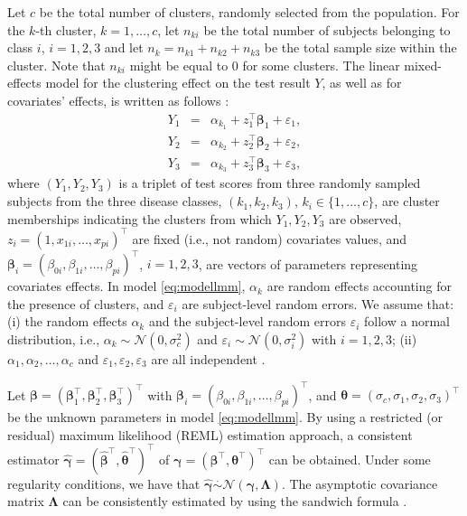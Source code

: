 Let $c$ be the total number of clusters, randomly selected from the population. For the $k$-th cluster, $k=1, \ldots, c$, let $n_{ki}$ be the total number of subjects belonging to class $i$, $i = 1,2,3$ and let $n_k = n_{k1} + n_{k2} + n_{k3}$ be the total sample size within the cluster. Note that $n_{ki}$ might be equal to 0 for some clusters. The linear {mixed-effects} model for the clustering effect on the test result $Y$, as well as for covariates' effects, is written as follows \citep{xiong2018estimating, khanh2022}: 
\begin{eqnarray}
    Y_{1} &=& \alpha_{k_1} + z_1^\top \boldsymbol{\beta}_1 + \varepsilon_{1}, \nonumber \\
    Y_{2} &=& \alpha_{k_2} + z_2^\top  \boldsymbol{\beta}_2 + \varepsilon_{2}, \label{eq:modellmm} \\
    Y_{3} &=& \alpha_{k_3} + z_3^\top \boldsymbol{\beta}_3 + \varepsilon_{3}, \nonumber
\end{eqnarray}
where $(Y_1, Y_2, Y_3)$ is a triplet of test scores from three randomly sampled subjects from the three disease classes, $(k_1, k_2, k_3)$, $k_i \in \{1, \ldots, c\}$, are cluster memberships indicating the clusters from which $Y_1, Y_2, Y_3$ are observed, $z_i = (1, x_{1i}, \ldots, x_{pi})^\top$ are fixed (i.e., not random) covariates values, and $\boldsymbol{\beta}_i = (\beta_{0i}, \beta_{1i}, \ldots, \beta_{pi})^\top$, $i=1,2,3$, are vectors of parameters representing covariates effects. In model \eqref{eq:modellmm}, $\alpha_{k}$ are random effects accounting for the presence of clusters, and $\varepsilon_{i}$ are subject-level random errors. We assume that: (i) the random effects $\alpha_{k}$ and the subject-level random errors  $\varepsilon_{i}$ follow a normal distribution, i.e., $\alpha_{k} \sim \mathcal{N}(0, \sigma^2_c)$ and $\varepsilon_{i} \sim \mathcal{N}(0, \sigma^2_i)$ with $i = 1,2,3$; (ii) $\alpha_{1}, \alpha_{2}, \ldots, \alpha_{c}$ and $\varepsilon_{1}, \varepsilon_{2}, \varepsilon_{3}$ are all independent \citep[see also,][]{mcculloch2004generalized}.

Let $\boldsymbol{\beta} = (\boldsymbol{\beta}_1^\top, \boldsymbol{\beta}_2^\top, \boldsymbol{\beta}_3^\top)^\top$ with $\boldsymbol{\beta}_i = (\beta_{0i}, \beta_{1i}, \ldots, \beta_{pi})^\top$, and $\boldsymbol{\theta} = (\sigma_c, \sigma_1, \sigma_2, \sigma_3)^\top$ be the unknown parameters in model \eqref{eq:modellmm}. By using a restricted (or residual) maximum likelihood (REML) estimation approach, a consistent estimator $\widehat{\boldsymbol{\gamma}} = (\widehat{\boldsymbol{\beta}}^\top, \widehat{\boldsymbol{\theta}}^\top)^\top$ of $\boldsymbol{\gamma} = (\boldsymbol{\beta}^\top, \boldsymbol{\theta}^\top)^\top$ can be obtained. Under some regularity conditions, we have that $\widehat{\boldsymbol{\gamma}} \stackrel{.}{\sim} \mathcal{N}(\boldsymbol{\gamma}, \boldsymbol{\Lambda})$. The asymptotic covariance matrix $\boldsymbol{\Lambda}$ can be consistently estimated by using the sandwich formula \citep{liang1986longitudinal, kauermann2001note, mancl2001covariance}.

